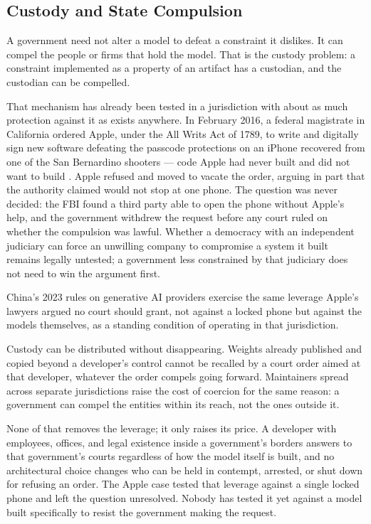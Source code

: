 \subsection{Custody and State Compulsion}
\label{sec:6.3.2}
A government need not alter a model to defeat a constraint it dislikes.
It can compel the people or firms that hold the model. That is the
custody problem: a constraint implemented as a property of an artifact
has a custodian, and the custodian can be compelled.

That mechanism has already been tested in a jurisdiction with about as much protection against it as exists anywhere. In February 2016, a federal magistrate in California ordered Apple, under the All Writs Act of 1789, to write and digitally sign new software defeating the passcode protections on an iPhone recovered from one of the San Bernardino shooters — code Apple had never built and did not want to build \autocite{pym2016applefbi}. Apple refused and moved to vacate the order, arguing in part that the authority claimed would not stop at one phone. The question was never decided: the FBI found a third party able to open the phone without Apple's help, and the government withdrew the request before any court ruled on whether the compulsion was lawful. Whether a democracy with an independent judiciary can force an unwilling company to compromise a system it built remains legally untested; a government less constrained by that judiciary does not need to win the argument first.

China's 2023 rules on generative AI providers exercise the same leverage Apple's lawyers argued no court should grant, not against a locked phone but against the models themselves, as a standing condition of operating in that jurisdiction.

Custody can be distributed without disappearing. Weights already
published and copied beyond a developer's control cannot be recalled by
a court order aimed at that developer, whatever the order compels going
forward. Maintainers spread across separate jurisdictions raise the cost
of coercion for the same reason: a government can compel the entities
within its reach, not the ones outside it.

None of that removes the leverage; it only raises its price. A developer with employees, offices, and legal existence inside a government's borders answers to that government's courts regardless of how the model itself is built, and no architectural choice changes who can be held in contempt, arrested, or shut down for refusing an order. The Apple case tested that leverage against a single locked phone and left the question unresolved. Nobody has tested it yet against a model built specifically to resist the government making the request.
